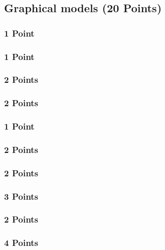 \newif\ifvimbug
\vimbugfalse

\ifvimbug

\fi


\subsection{Graphical models (20 Points)}
\subsubsection{1 Point}

\subsubsection{1 Point}

\subsubsection{2 Points}

\subsubsection{2 Points}

\subsubsection{1 Point}

\subsubsection{2 Points}

\subsubsection{2 Points}

\subsubsection{3 Points}

\subsubsection{2 Points}

\subsubsection{4 Points}

